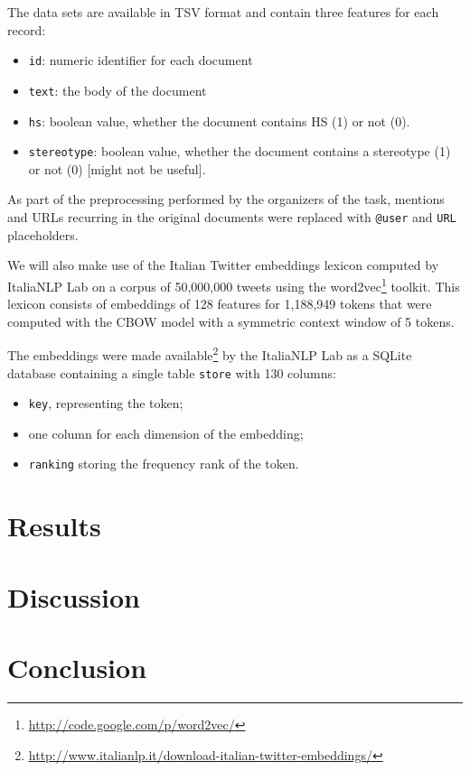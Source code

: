 \documentclass[a4paper, 10pt, twocolumn, DIV=calc]{scrartcl}
\begin{document}
The data sets are available in TSV format and contain three features for each record:
\begin{itemize}
    \item{\texttt{id}:} numeric identifier for each document
    \item{\texttt{text}:} the body of the document
    \item{\texttt{hs}:} boolean value, whether the document contains HS (1) or not (0).
    \item{\texttt{stereotype}:} boolean value, whether the document contains a stereotype (1) or not (0) [might not be useful].
\end{itemize}

As part of the preprocessing performed by the organizers of the task, mentions and URLs recurring in the original documents were replaced with \texttt{@user} and \texttt{URL} placeholders.

We will also make use of the Italian Twitter embeddings \cite{italian_twitter_embeddings} lexicon computed by ItaliaNLP Lab on a corpus of 50,000,000 tweets using the word2vec\footnote{\url{http://code.google.com/p/word2vec/}} toolkit.
This lexicon consists of embeddings of 128 features for 1,188,949 tokens that were computed with the CBOW model with a symmetric context window of 5 tokens.

The embeddings were made available\footnote{\url{http://www.italianlp.it/download-italian-twitter-embeddings/}} by the ItaliaNLP Lab as a SQLite database containing a single table \texttt{store} with 130 columns:
\begin{itemize}
    \item \texttt{key}, representing the token;
    \item one column for each dimension of the embedding;
    \item \texttt{ranking} storing the frequency rank of the token.
\end{itemize}







\section{Results}
\section{Discussion}
\section{Conclusion}

\printbibliography{}
\end{document}
